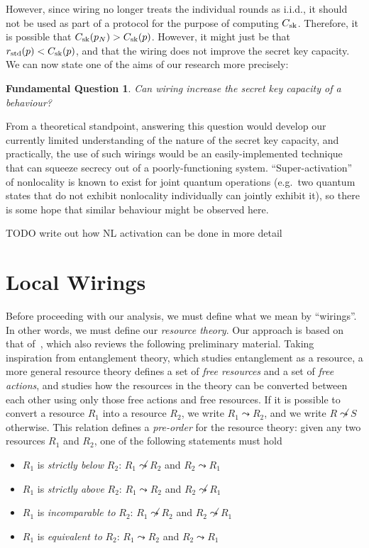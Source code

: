 \documentclass[10pt, a4paper]{article}
\numberwithin{equation}{section} %
\theoremstyle{definition}
\theoremstyle{plain}
\newtheorem{funqn}{Fundamental Question}
\newcommand{\?}{\mathrel{?}} %
\newcommand{\sk}{\rm sk}
\newcommand{\std}{\rm std}
\begin{document}
      However, since wiring no longer treats the individual rounds as i.i.d., it should not be used as part of a protocol for the purpose of computing \(C_{\sk}\). Therefore, it is possible that \(C_{\sk}(p_N) > C_{\sk}(p)\). However, it might just be that \(r_{\std}(p) < C_{\sk}(p)\), and that the wiring does not improve the secret key capacity. We can now state one of the aims of our research more precisely:
      \begin{funqn}\label{fqn:wircap}
        Can wiring increase the secret key capacity of a behaviour?
      \end{funqn}

      From a theoretical standpoint, answering this question would develop our currently limited understanding of the nature of the secret key capacity, and practically, the use of such wirings would be an easily-implemented technique that can squeeze secrecy out of a poorly-functioning system. ``Super-activation'' of nonlocality is known to exist for joint quantum operations (e.g.\ two quantum states that do not exhibit nonlocality individually can jointly exhibit it), so there is some hope that similar behaviour might be observed here.

      TODO write out how NL activation can be done in more detail

      \section{Local Wirings}\label{sec:locwir}

      Before proceeding with our analysis, we must define what we mean by ``wirings''. In other words, we must define our \emph{resource theory}. Our approach is based on that of~\cite{BellResourceTheory}, which also reviews the following preliminary material. Taking inspiration from entanglement theory, which studies entanglement as a resource, a more general resource theory defines a set of \emph{free resources} and a set of \emph{free actions}, and studies how the resources in the theory can be converted between each other using only those free actions and free resources. If it is possible to convert a resource \(R_1\) into a resource \(R_2\), we write \(R_1 \leadsto R_2\), and we write \(R \not\leadsto S\) otherwise. This relation defines a \emph{pre-order} for the resource theory: given any two resources \(R_1\) and \(R_2\), one of the following statements must hold
      \begin{itemize}
        \item \(R_1\) is \emph{strictly below} \(R_2\): \(R_1 \not\leadsto R_2\) and \(R_2 \leadsto R_1\)
        \item \(R_1\) is \emph{strictly above} \(R_2\): \(R_1 \leadsto R_2\) and \(R_2 \not\leadsto R_1\)
        \item \(R_1\) is \emph{incomparable to} \(R_2\): \(R_1 \not\leadsto R_2\) and \(R_2 \not\leadsto R_1\)
        \item \(R_1\) is \emph{equivalent to} \(R_2\): \(R_1 \leadsto R_2\) and \(R_2 \leadsto R_1\)
      \end{itemize}
\end{document}

